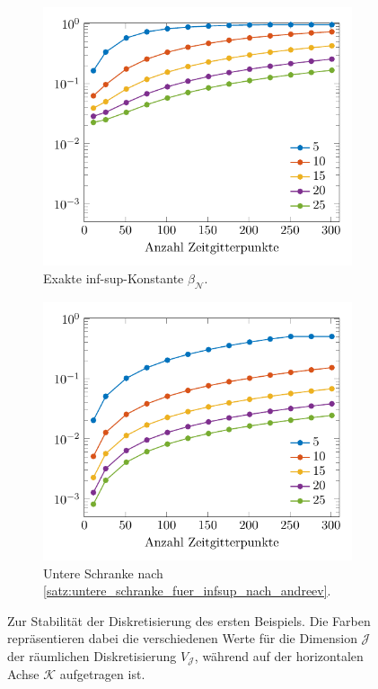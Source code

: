 \documentclass[../main.tex]{subfiles}
\begin{document}
\begin{figure}[tb]
    \centering
    \begin{subfigure}[b]{0.495\textwidth}
        \centering
        \includegraphics[width=1\textwidth]{figures/chapter4/stability_sine_dataset1_fig_1.pdf}
        \caption{Exakte inf-sup-Konstante $\beta_{\mathcal N}$.}
    \end{subfigure}
    \begin{subfigure}[b]{0.495\textwidth}
        \centering
        \includegraphics[width=1\textwidth]{figures/chapter4/stability_sine_dataset1_fig_2.pdf}
        \caption{Untere Schranke nach \cref{satz:untere_schranke_fuer_infsup_nach_andreev}.}
    \end{subfigure}
    \caption[Stabilität der Diskretisierung mit homogenen Randbedingungen, erstes Beispiel.]{%
        Zur Stabilität der Diskretisierung des ersten Beispiels.
        Die Farben repräsentieren dabei die verschiedenen Werte für die Dimension $\mathcal J$ der räumlichen Diskretisierung $V_{\mathcal J}$, während auf der horizontalen Achse $\mathcal K$ aufgetragen ist.
        }
    \label{figure:infsup_homogen_ein_feld}
\end{figure}
\end{document}

